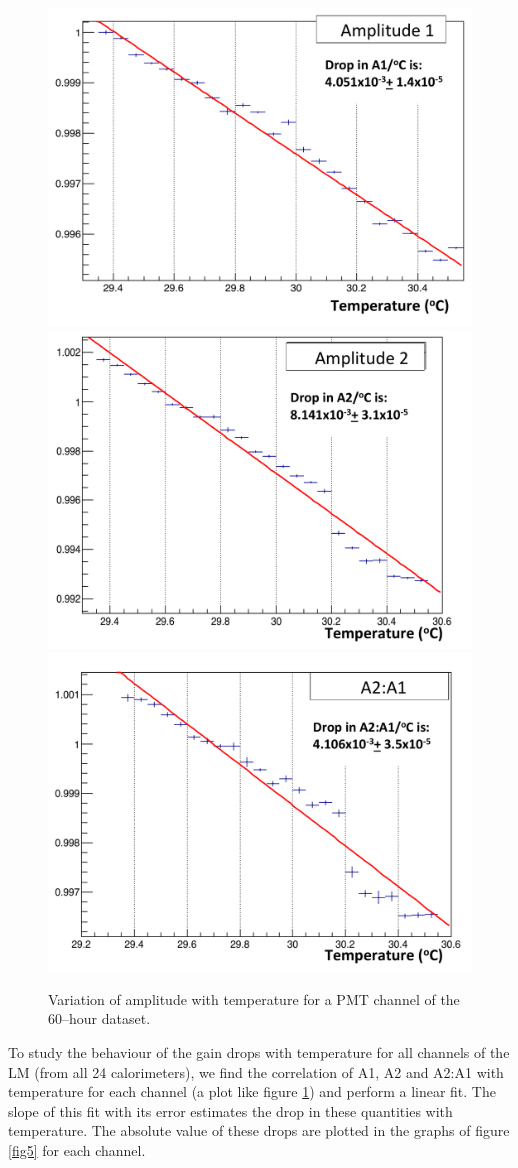\documentclass[article,accept,moreauthors,pdftex,10pt,a4paper]{Definitions/mdpi}
\begin{document}
\begin{figure}[H]
\centering
\includegraphics[width=5 cm]{amp1_temp_60hr.pdf}
\includegraphics[width=5 cm]{amp2_temp_60hr.pdf}
\includegraphics[width=5 cm]{a2_a1_temp_60hr.pdf}
\caption{\label{fig4}Variation of amplitude with temperature for a PMT channel of the 60--hour dataset. }
\end{figure}  
To study the behaviour of the gain drops with temperature for all channels of the LM 
(from all 24 calorimeters), we find the correlation of A1, A2 and A2:A1 with temperature for each 
channel (a plot like figure \ref{fig4}) and perform a linear fit. The slope of this fit with its error 
estimates the drop in these quantities with temperature. The absolute value of these drops are plotted 
in the graphs of figure \ref{fig5} for each channel.
\end{document}

